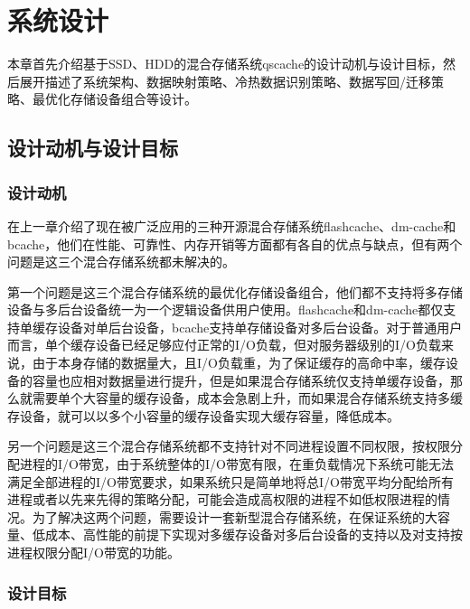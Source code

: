 
\chapter{系统设计}
\label{chap:sys_design}

本章首先介绍基于SSD、HDD的混合存储系统qscache的设计动机与设计目标，然后展开描述了系统架构、数据映射策略、冷热数据识别策略、数据写回/迁移策略、最优化存储设备组合等设计。

\section{设计动机与设计目标}

\subsection{设计动机}

在上一章介绍了现在被广泛应用的三种开源混合存储系统flashcache、dm-cache和bcache，他们在性能、可靠性、内存开销等方面都有各自的优点与缺点，但有两个问题是这三个混合存储系统都未解决的。

第一个问题是这三个混合存储系统的最优化存储设备组合，他们都不支持将多存储设备与多后台设备统一为一个逻辑设备供用户使用。flashcache和dm-cache都仅支持单缓存设备对单后台设备，bcache支持单存储设备对多后台设备。对于普通用户而言，单个缓存设备已经足够应付正常的I/O负载，但对服务器级别的I/O负载来说，由于本身存储的数据量大，且I/O负载重，为了保证缓存的高命中率，缓存设备的容量也应相对数据量进行提升，但是如果混合存储系统仅支持单缓存设备，那么就需要单个大容量的缓存设备，成本会急剧上升，而如果混合存储系统支持多缓存设备，就可以以多个小容量的缓存设备实现大缓存容量，降低成本。

另一个问题是这三个混合存储系统都不支持针对不同进程设置不同权限，按权限分配进程的I/O带宽，由于系统整体的I/O带宽有限，在重负载情况下系统可能无法满足全部进程的I/O带宽要求，如果系统只是简单地将总I/O带宽平均分配给所有进程或者以先来先得的策略分配，可能会造成高权限的进程不如低权限进程的情况。为了解决这两个问题，需要设计一套新型混合存储系统，在保证系统的大容量、低成本、高性能的前提下实现对多缓存设备对多后台设备的支持以及对支持按进程权限分配I/O带宽的功能。

\subsection{设计目标}

